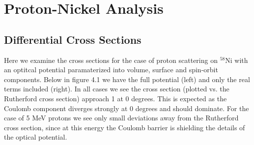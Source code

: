 \documentclass[paper=a4, fontsize=11pt]{scrartcl} %
\numberwithin{equation}{section} %
\numberwithin{figure}{section} %
\numberwithin{table}{section} %
\begin{document}
\section{Proton-Nickel Analysis}
\subsection{Differential Cross Sections}

Here we examine the cross sections for the case of proton scattering on $^{58}$Ni with an optitcal potential paramaterized into volume, surface and spin-orbit components.  Below in figure 4.1 we have the full potential (left) and only the real terms included (right).  In all cases we see the cross section (plotted vs. the Rutherford cross section) approach 1 at 0 degrees.  This is expected as the Coulomb component diverges strongly at 0 degrees and should dominate.  For the case of 5 MeV protons we see only small deviations away from the Rutherford cross section, since at this energy the Coulomb barrier is shielding the details of the optical potential.   
\end{document}
